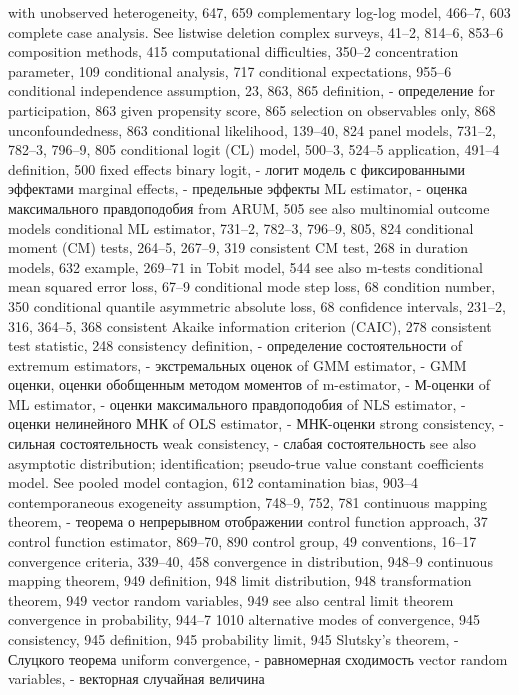 with unobserved heterogeneity, 647, 659 complementary log-log model, 466–7, 603 complete case analysis. See listwise deletion complex surveys, 41–2, 814–6, 853–6 composition methods, 415
computational difficulties, 350–2
concentration parameter, 109
conditional analysis, 717
conditional expectations, 955–6
conditional independence assumption, 23, 863, 865
definition, - определение
for participation, 863
given propensity score, 865 selection on observables only, 868 unconfoundedness, 863
conditional likelihood, 139–40, 824
panel models, 731–2, 782–3, 796–9, 805
conditional logit (CL) model, 500–3, 524–5 application, 491–4
definition, 500
fixed effects binary logit, - логит модель с фиксированными эффектами 
marginal effects, - предельные эффекты
ML estimator, - оценка максимального правдоподобия
from ARUM, 505
see also multinomial outcome models
conditional ML estimator, 731–2, 782–3, 796–9, 805, 824
conditional moment (CM) tests, 264–5, 267–9, 319 consistent CM test, 268
in duration models, 632
example, 269–71
in Tobit model, 544
see also m-tests conditional mean
squared error loss, 67–9 conditional mode
step loss, 68 condition number, 350 conditional quantile
asymmetric absolute loss, 68
confidence intervals, 231–2, 316, 364–5, 368 consistent Akaike information criterion (CAIC), 278 consistent test statistic, 248
consistency definition, - определение состоятельности
of extremum estimators, - экстремальных оценок
of GMM estimator, - GMM оценки, оценки обобщенным методом моментов
of m-estimator, - М-оценки
of ML estimator, - оценки максимального правдоподобия
of NLS estimator, - оценки нелинейного МНК
of OLS estimator, - МНК-оценки
strong consistency, - сильная состоятельность
weak consistency, - слабая состоятельность
see also asymptotic distribution; identification;
pseudo-true value
constant coefficients model. See pooled model contagion, 612
contamination bias, 903–4
contemporaneous exogeneity assumption, 748–9, 752,
781
continuous mapping theorem, - теорема о непрерывном отображении 
control function approach, 37
control function estimator, 869–70, 890 control group, 49
conventions, 16–17
convergence criteria, 339–40, 458 convergence in distribution, 948–9
continuous mapping theorem, 949 definition, 948
limit distribution, 948 transformation theorem, 949 vector random variables, 949
see also central limit theorem convergence in probability, 944–7
1010
alternative modes of convergence, 945
consistency, 945
definition, 945
probability limit, 945
Slutsky’s theorem, - Слуцкого теорема 
uniform convergence, - равномерная сходимость 
vector random variables, - векторная случайная величина 
